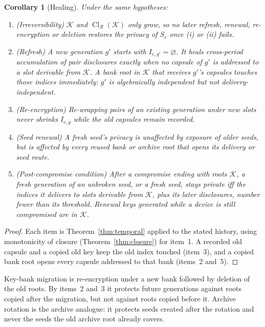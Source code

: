 \documentclass[pdflatex,sn-mathphys-num,twocolumn]{sn-jnl}
\theoremstyle{plain}
\newtheorem{corollary}[theorem]{Corollary}
\theoremstyle{definition}
\newcommand{\Cl}{\operatorname{Cl}}
\begin{document}
\begin{corollary}[Healing]\label{cor:healing}
Under the same hypotheses:
\begin{enumerate}
\item (Irreversibility) $\mathcal K$ and $\Cl_{\mathcal R}(\mathcal K)$ only grow, so no later refresh, renewal, re-encryption or deletion restores the privacy of $S_e$ once (i) or (ii) fails.
\item (Refresh) A new generation $g'$ starts with $I_{e,g'}=\varnothing$. It heals cross-period accumulation of pair disclosures exactly when no capsule of $g'$ is addressed to a slot derivable from $\mathcal K$. A bank root in $\mathcal K$ that receives $g'$'s capsules touches those indices immediately: $g'$ is algebraically independent but not delivery-independent.
\item (Re-encryption) Re-wrapping pairs of an existing generation under new slots never shrinks $I_{e,g}$ while the old capsules remain recorded.
\item (Seed renewal) A fresh seed's privacy is unaffected by exposure of older seeds, but is affected by every reused bank or archive root that opens its delivery or seed route.
\item (Post-compromise condition) After a compromise ending with roots $\mathcal K$, a fresh generation of an unbroken seed, or a fresh seed, stays private iff the indices it delivers to slots derivable from $\mathcal K$, plus its later disclosures, number fewer than its threshold. Renewal keys generated while a device is still compromised are in $\mathcal K$.
\end{enumerate}
\end{corollary}
\begin{proof}
Each item is Theorem~\ref{thm:temporal} applied to the stated history, using monotonicity of closure (Theorem~\ref{thm:closure}) for item~1. A recorded old capsule and a copied old key keep the old index touched (item~3), and a copied bank root opens every capsule addressed to that bank (items~2 and~5).
\end{proof}

Key-bank migration is re-encryption under a new bank followed by deletion of the old roots. By items~2 and~3 it protects future generations against roots copied after the migration, but not against roots copied before it. Archive rotation is the archive analogue: it protects seeds created after the rotation and never the seeds the old archive root already covers.
\end{document}
